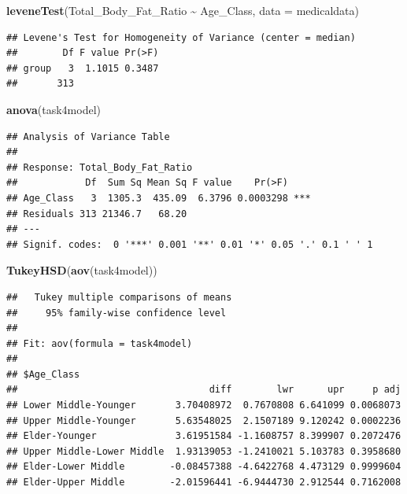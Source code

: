 \documentclass[
]{article}
\newenvironment{Shaded}{\begin{snugshade}}{\end{snugshade}}
\newcommand{\AttributeTok}[1]{\textcolor[rgb]{0.13,0.29,0.53}{#1}}
\newcommand{\FunctionTok}[1]{\textcolor[rgb]{0.13,0.29,0.53}{\textbf{#1}}}
\newcommand{\NormalTok}[1]{#1}
\newcommand{\SpecialCharTok}[1]{\textcolor[rgb]{0.81,0.36,0.00}{\textbf{#1}}}
\begin{document}
\begin{Shaded}
\begin{Highlighting}[]
\FunctionTok{leveneTest}\NormalTok{(Total\_Body\_Fat\_Ratio }\SpecialCharTok{\textasciitilde{}}\NormalTok{ Age\_Class, }\AttributeTok{data =}\NormalTok{ medicaldata)}
\end{Highlighting}
\end{Shaded}

\begin{verbatim}
## Levene's Test for Homogeneity of Variance (center = median)
##        Df F value Pr(>F)
## group   3  1.1015 0.3487
##       313
\end{verbatim}

\begin{Shaded}
\begin{Highlighting}[]
\FunctionTok{anova}\NormalTok{(task4model)}
\end{Highlighting}
\end{Shaded}

\begin{verbatim}
## Analysis of Variance Table
## 
## Response: Total_Body_Fat_Ratio
##            Df  Sum Sq Mean Sq F value    Pr(>F)    
## Age_Class   3  1305.3  435.09  6.3796 0.0003298 ***
## Residuals 313 21346.7   68.20                      
## ---
## Signif. codes:  0 '***' 0.001 '**' 0.01 '*' 0.05 '.' 0.1 ' ' 1
\end{verbatim}

\begin{Shaded}
\begin{Highlighting}[]
\FunctionTok{TukeyHSD}\NormalTok{(}\FunctionTok{aov}\NormalTok{(task4model))}
\end{Highlighting}
\end{Shaded}

\begin{verbatim}
##   Tukey multiple comparisons of means
##     95% family-wise confidence level
## 
## Fit: aov(formula = task4model)
## 
## $Age_Class
##                                  diff        lwr      upr     p adj
## Lower Middle-Younger       3.70408972  0.7670808 6.641099 0.0068073
## Upper Middle-Younger       5.63548025  2.1507189 9.120242 0.0002236
## Elder-Younger              3.61951584 -1.1608757 8.399907 0.2072476
## Upper Middle-Lower Middle  1.93139053 -1.2410021 5.103783 0.3958680
## Elder-Lower Middle        -0.08457388 -4.6422768 4.473129 0.9999604
## Elder-Upper Middle        -2.01596441 -6.9444730 2.912544 0.7162008
\end{verbatim}
\end{document}
